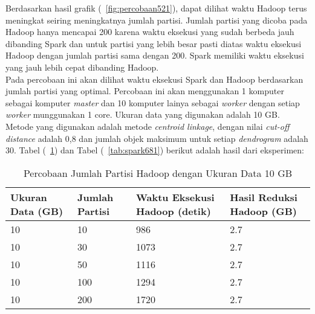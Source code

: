 Berdasarkan hasil grafik (~\ref{fig:percobaan521}), dapat dilihat waktu Hadoop terus meningkat seiring meningkatnya jumlah partisi. Jumlah partisi yang dicoba pada Hadoop hanya mencapai 200 karena waktu eksekusi yang sudah berbeda jauh dibanding Spark dan untuk partisi yang lebih besar pasti diatas waktu eksekusi Hadoop dengan jumlah partisi sama dengan 200. Spark memiliki waktu eksekusi yang jauh lebih cepat dibanding Hadoop. \\







Pada percobaan ini akan dilihat waktu eksekusi Spark dan Hadoop berdasarkan jumlah partisi yang optimal. Percobaan ini akan menggunakan 1 komputer sebagai komputer \textit{master} dan 10 komputer lainya sebagai \textit{worker} dengan setiap \textit{worker} munggunakan 1 core. Ukuran data yang digunakan adalah 10 GB. Metode yang digunakan adalah metode \textit{centroid linkage}, dengan nilai \textit{cut-off distance} adalah 0,8 dan jumlah objek maksimum untuk setiap \textit{dendrogram} adalah 30. Tabel (~\ref{tab:spark671}) dan Tabel (~\ref{tab:spark681}) berikut adalah hasil dari eksperimen:


\begin{table}[H] 
	\centering 
	\caption{Percobaan Jumlah Partisi Hadoop dengan Ukuran Data 10 GB}
	\label{tab:spark671}
	\begin{tabular}{|p{3cm}|p{3cm}|p{4cm}|p{4cm}|}
\hline
Ukuran Data (GB) & Jumlah Partisi &  Waktu Eksekusi Hadoop (detik) & Hasil Reduksi Hadoop (GB)\\
\hline
10 & 10 & 986  & 2.7  \\
\hline
10 & 30 & 1073  & 2.7  \\
\hline
10 & 50 & 1116  & 2.7  \\
\hline
10 & 100 & 1294  & 2.7  \\
\hline
10 & 200 & 1720  & 2.7  \\
\hline

\hline

	\end{tabular} 
\end{table}




